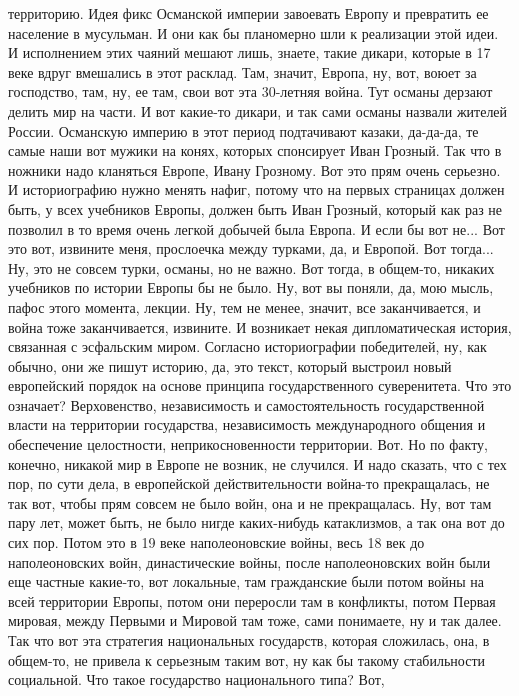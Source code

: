 территорию. Идея фикс Османской империи завоевать Европу и превратить ее
население в мусульман. И они как бы планомерно шли к реализации этой идеи. И
исполнением этих чаяний мешают лишь, знаете, такие дикари, которые в 17 веке
вдруг вмешались в этот расклад. Там, значит, Европа, ну, вот, воюет за
господство, там, ну, ее там, свои вот эта 30-летняя война. Тут османы дерзают
делить мир на части. И вот какие-то дикари, и так сами османы назвали жителей
России. Османскую империю в этот период подтачивают казаки, да-да-да, те самые
наши вот мужики на конях, которых спонсирует Иван Грозный. Так что в ножники
надо кланяться Европе, Ивану Грозному. Вот это прям очень серьезно. И
историографию нужно менять нафиг, потому что на первых страницах должен быть, у
всех учебников Европы, должен быть Иван Грозный, который как раз не позволил в
то время очень легкой добычей была Европа. И если бы вот не... Вот это вот,
извините меня, прослоечка между турками, да, и Европой. Вот тогда... Ну, это не
совсем турки, османы, но не важно. Вот тогда, в общем-то, никаких учебников по
истории Европы бы не было. Ну, вот вы поняли, да, мою мысль, пафос этого
момента, лекции. Ну, тем не менее, значит, все заканчивается, и война тоже
заканчивается, извините. И возникает некая дипломатическая история, связанная с
эсфальским миром. Согласно историографии победителей, ну, как обычно, они же
пишут историю, да, это текст, который выстроил новый европейский порядок на
основе принципа государственного суверенитета. Что это означает? Верховенство,
независимость и самостоятельность государственной власти на территории
государства, независимость международного общения и обеспечение целостности,
неприкосновенности территории. Вот. Но по факту, конечно, никакой мир в Европе
не возник, не случился. И надо сказать, что с тех пор, по сути дела, в
европейской действительности война-то прекращалась, не так вот, чтобы прям
совсем не было войн, она и не прекращалась. Ну, вот там пару лет, может быть, не
было нигде каких-нибудь катаклизмов, а так она вот до сих пор. Потом это в 19
веке наполеоновские войны, весь 18 век до наполеоновских войн, династические
войны, после наполеоновских войн были еще частные какие-то, вот локальные, там
гражданские были потом войны на всей территории Европы, потом они переросли там
в конфликты, потом Первая мировая, между Первыми и Мировой там тоже, сами
понимаете, ну и так далее. Так что вот эта стратегия национальных государств,
которая сложилась, она, в общем-то, не привела к серьезным таким вот, ну как бы
такому стабильности социальной. Что такое государство национального типа? Вот,
